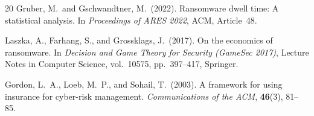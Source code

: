 \documentclass[12pt,a4paper]{article}
\theoremstyle{plain}
\theoremstyle{definition}
\theoremstyle{remark}
\begin{document}
\begin{thebibliography}{20}
Gruber, M.\ and Gschwandtner, M.\ (2022).
Ransomware dwell time: A statistical analysis.
In \textit{Proceedings of ARES 2022}, ACM, Article~48.

Laszka, A., Farhang, S., and Grossklags, J.\ (2017).
On the economics of ransomware.
In \textit{Decision and Game Theory for Security (GameSec 2017)},
Lecture Notes in Computer Science, vol.\ 10575, pp.\ 397--417, Springer.

Gordon, L.\ A., Loeb, M.\ P., and Sohail, T.\ (2003).
A framework for using insurance for cyber-risk management.
\textit{Communications of the ACM}, \textbf{46}(3), 81--85.

\end{thebibliography}
\end{document}
